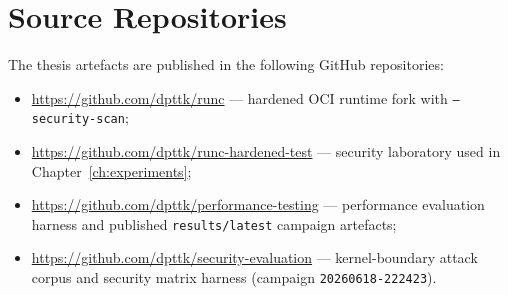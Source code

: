 
\appendix

\chapter{Source Repositories}\label{app:repos}

The thesis artefacts are published in the following GitHub repositories:

\begin{itemize}
    \item \url{https://github.com/dpttk/runc} --- hardened OCI runtime fork with \texttt{--security-scan};
    \item \url{https://github.com/dpttk/runc-hardened-test} --- security laboratory used in Chapter~\ref{ch:experiments};
    \item \url{https://github.com/dpttk/performance-testing} --- performance evaluation harness and published \texttt{results/latest} campaign artefacts;
    \item \url{https://github.com/dpttk/security-evaluation} --- kernel-boundary attack corpus and security matrix harness (campaign \texttt{20260618-222423}).
\end{itemize}
